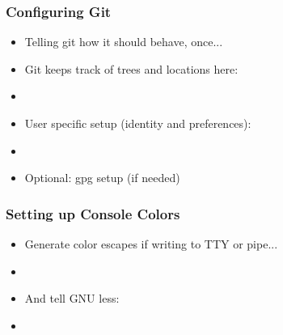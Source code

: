 \begin{slide}[fragile]
  \frametitle{Configuring Git}
  \begin{itemize}
    \item Telling git how it should behave, once...
    \item Git keeps track of trees and locations here:
    \item[]
    \item User specific setup (identity and preferences):
    \item[]
    \item Optional: gpg setup (if needed)
  \end{itemize}
\end{slide}

\begin{slide}[fragile]
  \frametitle{Setting up Console Colors}
  \begin{itemize}
  \item Generate color escapes if writing to TTY or pipe...
  \item[]
  \item And tell GNU less:
  \item[]
  \end{itemize}
\end{slide}

